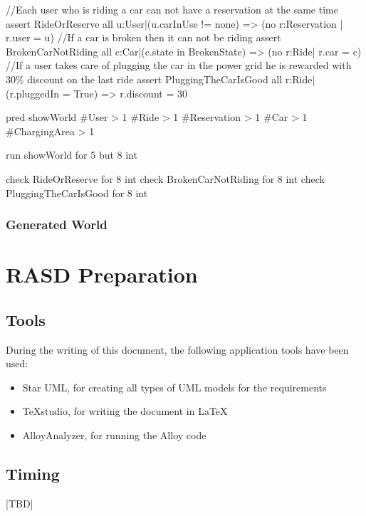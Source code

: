 \documentclass[11pt,a4paper]{report}
\begin{document}
\begin{alloyCode}
//Each user who is riding a car can not have a reservation at the same time
assert RideOrReserve{
	all u:User|(u.carInUse != none) => (no r:Reservation | r.user = u)
}
//If a car is broken then it can not be riding
assert BrokenCarNotRiding{
	all c:Car|(c.state in BrokenState) => (no r:Ride| r.car = c)
}
//If a user takes care of plugging the car in the power grid he is rewarded with 30\% discount on the last ride
assert PluggingTheCarIsGood{
	all r:Ride|(r.pluggedIn = True) => r.discount = 30
}

pred showWorld{
	#User > 1
	#Ride > 1 
	#Reservation > 1
	#Car > 1 
	#ChargingArea > 1
}

run showWorld for 5 but 8 int

check RideOrReserve for 8 int
check BrokenCarNotRiding for 8 int
check PluggingTheCarIsGood for 8 int
\end{alloyCode}
\vspace*{0.3cm} %
\subsection{Generated World}

\chapter{RASD Preparation}
\section{Tools}
During the writing of this document, the following application tools have been used:
\begin{itemize}
	\item Star UML, for creating all types of UML models for the requirements
	\item TeXstudio, for writing the document in \LaTeX
	\item AlloyAnalyzer, for running the Alloy code 
\end{itemize}
\section{Timing}
[TBD]
%
\end{document}
